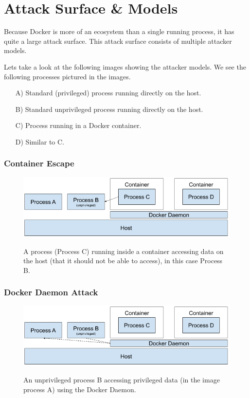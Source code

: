 \section{Attack Surface \& Models}

Because Docker is more of an ecosystem than a single running process, it has quite a large attack surface. This attack surface consists of multiple attacker models.

\hfill

Lets take a look at the following images showing the attacker models.
We see the following processes pictured in the images.
\begin{enumerate}
    \item[A)] Standard (privileged) process running directly on the host.
    \item[B)] Standard unprivileged process running directly on the host.
    \item[C)] Process running in a Docker container.
    \item[D)] Similar to C.
\end{enumerate}

\subsubsection*{Container Escape}
\begin{figure}[ht]
    \centering
    \includegraphics[width=.9\linewidth]{resources/images/attack-scenario-3.png}
    \caption{}\label{fig:container-escape}
    \medskip
    \small
    A process (Process C) running inside a container accessing data on the host (that it should not be able to access), in this case Process B.
\end{figure}

\subsubsection*{Docker Daemon Attack}
\begin{figure}[ht]
    \centering
    \includegraphics[width=.9\linewidth]{resources/images/attack-scenario-1.png}
    \caption{}\label{fig:docker-daemon-attack}
    \medskip
    \small
    An unprivileged process B accessing privileged data (in the image process A) using the Docker Daemon.
\end{figure}

